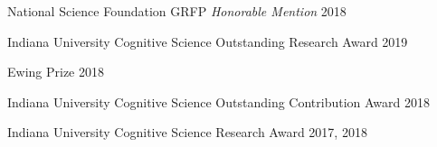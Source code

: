 

\iffalse
\cvsubsection{\textit{Submitted}}

\begin{cvhonors}
  \cvhonor
    {NSF GRFP} %
    {} %
    {} %

\end{cvhonors}
\fi



\begin{cvhonors}

  \cvhonor
    {National Science Foundation GRFP \textit{Honorable Mention}} %
    {} %
    {2018} %
    
  \cvhonor
    {Indiana University Cognitive Science Outstanding Research Award } %
    {} %
    {2019} %
    
  \cvhonor
    {Ewing Prize} %
    {} %
    {2018} %

  \cvhonor
    {Indiana University Cognitive Science Outstanding Contribution Award} %
    {} %
    {2018} %

  \cvhonor
    {Indiana University Cognitive Science Research Award} %
    {} %
    {2017, 2018} %

\end{cvhonors}

\iffalse

\cvsubsection{Not Funded}

\begin{cvhonors}

  \cvhonor
    {3rd Place} %
    {WITHCON Hacking Competition Final} %
    {Seoul, S.Korea} %
    {2015} %

  \cvhonor
    {Silver Prize} %
    {KISA HDCON Hacking Competition Final} %
    {Seoul, S.Korea} %
    {2017} %

\end{cvhonors}
\fi

